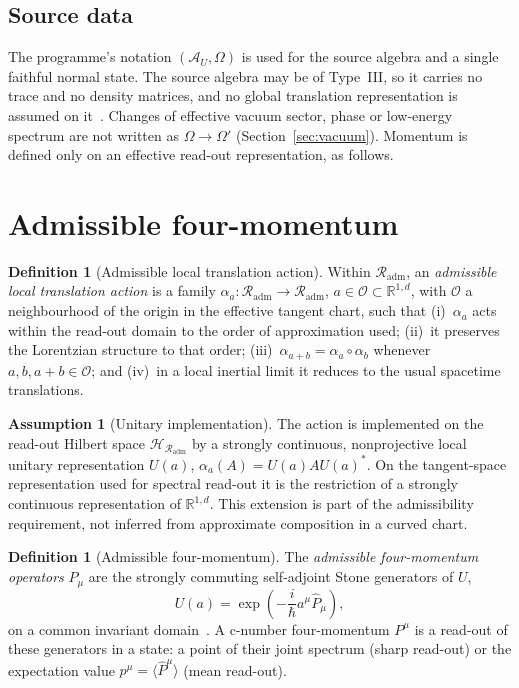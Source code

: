 \documentclass[12pt,a4paper]{article}
\theoremstyle{definition}
\newtheorem{definition}[theorem]{Definition}
\newtheorem{assumption}[theorem]{Assumption}
\theoremstyle{remark}
\newcommand{\AU}{\mathcal{A}_U}
\newcommand{\Omegastate}{\Omega}
\newcommand{\Rout}{\mathcal{R}_{\mathrm{adm}}}
\begin{document}
\subsection{Source data}

The programme's notation $(\AU,\Omegastate)$ is used for the source algebra and a single faithful normal state. The source algebra may be of Type~III, so it carries no trace and no density matrices, and no global translation representation is assumed on it~\cite{Haag1996,Witten2018}. Changes of effective vacuum sector, phase or low-energy spectrum are not written as $\Omegastate\to\Omegastate'$ (Section~\ref{sec:vacuum}). Momentum is defined only on an effective read-out representation, as follows.

\section{Admissible four-momentum}
\label{sec:momentum}

\begin{definition}[Admissible local translation action]
\label{def:translation}
Within $\Rout$, an \emph{admissible local translation action} is a family $\alpha_a:\Rout\to\Rout$, $a\in\mathcal O\subset\mathbb R^{1,d}$, with $\mathcal O$ a neighbourhood of the origin in the effective tangent chart, such that (i)~$\alpha_a$ acts within the read-out domain to the order of approximation used; (ii)~it preserves the Lorentzian structure to that order; (iii)~$\alpha_{a+b}=\alpha_a\circ\alpha_b$ whenever $a,b,a+b\in\mathcal O$; and (iv)~in a local inertial limit it reduces to the usual spacetime translations.
\end{definition}

\begin{assumption}[Unitary implementation]
\label{ass:unitary}
The action is implemented on the read-out Hilbert space $\mathcal H_{\Rout}$ by a strongly continuous, nonprojective local unitary representation $U(a)$, $\alpha_a(A)=U(a)AU(a)^*$. On the tangent-space representation used for spectral read-out it is the restriction of a strongly continuous representation of $\mathbb R^{1,d}$. This extension is part of the admissibility requirement, not inferred from approximate composition in a curved chart.
\end{assumption}

\begin{definition}[Admissible four-momentum]
\label{def:momentum}
The \emph{admissible four-momentum operators} $\hat P_\mu$ are the strongly commuting self-adjoint Stone generators of $U$,
\[
U(a)=\exp\!\left(-\frac i\hbar a^\mu\hat P_\mu\right),
\]
on a common invariant domain~\cite{Stone1932,ReedSimon1972}. A c-number four-momentum $P^\mu$ is a read-out of these generators in a state: a point of their joint spectrum (sharp read-out) or the expectation value $p^\mu=\langle\hat P^\mu\rangle$ (mean read-out).
\end{definition}
\end{document}
